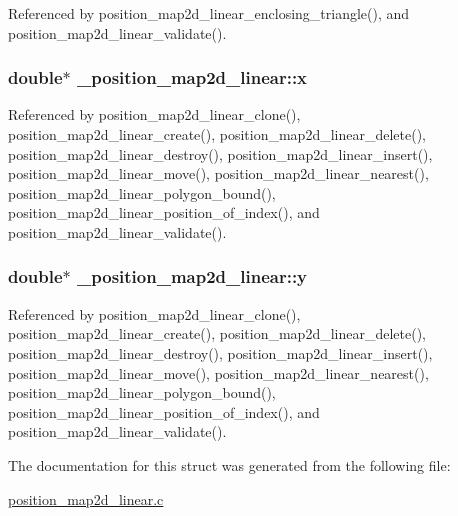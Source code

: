 Referenced by position\+\_\+map2d\+\_\+linear\+\_\+enclosing\+\_\+triangle(), and position\+\_\+map2d\+\_\+linear\+\_\+validate().

\subsubsection[{\texorpdfstring{x}{x}}]{\setlength{\rightskip}{0pt plus 5cm}double$\ast$ \+\_\+position\+\_\+map2d\+\_\+linear\+::x}\hypertarget{struct__position__map2d__linear_a076d1309c846cee9d291fbb58044970e}{}\label{struct__position__map2d__linear_a076d1309c846cee9d291fbb58044970e}


Referenced by position\+\_\+map2d\+\_\+linear\+\_\+clone(), position\+\_\+map2d\+\_\+linear\+\_\+create(), position\+\_\+map2d\+\_\+linear\+\_\+delete(), position\+\_\+map2d\+\_\+linear\+\_\+destroy(), position\+\_\+map2d\+\_\+linear\+\_\+insert(), position\+\_\+map2d\+\_\+linear\+\_\+move(), position\+\_\+map2d\+\_\+linear\+\_\+nearest(), position\+\_\+map2d\+\_\+linear\+\_\+polygon\+\_\+bound(), position\+\_\+map2d\+\_\+linear\+\_\+position\+\_\+of\+\_\+index(), and position\+\_\+map2d\+\_\+linear\+\_\+validate().

\subsubsection[{\texorpdfstring{y}{y}}]{\setlength{\rightskip}{0pt plus 5cm}double$\ast$ \+\_\+position\+\_\+map2d\+\_\+linear\+::y}\hypertarget{struct__position__map2d__linear_ad43100111e5cb77a711ce9e73ef8dc95}{}\label{struct__position__map2d__linear_ad43100111e5cb77a711ce9e73ef8dc95}


Referenced by position\+\_\+map2d\+\_\+linear\+\_\+clone(), position\+\_\+map2d\+\_\+linear\+\_\+create(), position\+\_\+map2d\+\_\+linear\+\_\+delete(), position\+\_\+map2d\+\_\+linear\+\_\+destroy(), position\+\_\+map2d\+\_\+linear\+\_\+insert(), position\+\_\+map2d\+\_\+linear\+\_\+move(), position\+\_\+map2d\+\_\+linear\+\_\+nearest(), position\+\_\+map2d\+\_\+linear\+\_\+polygon\+\_\+bound(), position\+\_\+map2d\+\_\+linear\+\_\+position\+\_\+of\+\_\+index(), and position\+\_\+map2d\+\_\+linear\+\_\+validate().



The documentation for this struct was generated from the following file\+:\begin{DoxyCompactItemize}
\item 
\hyperlink{position__map2d__linear_8c}{position\+\_\+map2d\+\_\+linear.\+c}\end{DoxyCompactItemize}
